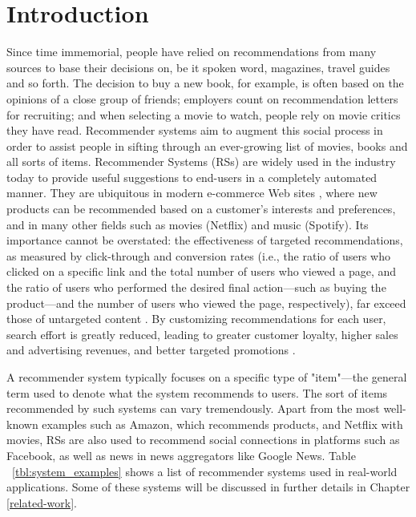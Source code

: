\documentclass[cic,tc,english]{iiufrgs}
\begin{document}



\chapter{Introduction} \label{introduction}
Since time immemorial, people have relied on recommendations from many sources to base their decisions on, be it spoken word, magazines, travel guides and so forth. The decision to buy a new book, for example, is often based on the opinions of a close group of friends; employers count on recommendation letters for recruiting; and when selecting a movie to watch, people rely on movie critics they have read. Recommender systems aim to augment this social process in order to assist people in sifting through an ever-growing list of movies, books and all sorts of items. Recommender Systems (RSs) are widely used in the industry today to provide useful suggestions to end-users in a completely automated manner. They are ubiquitous in modern e-commerce Web sites \cite{Schafer2001}, where new products can be recommended based on a customer's interests and preferences, and in many other fields such as movies (Netflix) and music (Spotify). Its importance cannot be overstated: the effectiveness of targeted recommendations, as measured by click-through and conversion rates (i.e., the ratio of users who clicked on a specific link and the total number of users who viewed a page, and the ratio of users who performed the desired final action---such as buying the product---and the number of users who viewed the page, respectively), far exceed those of untargeted content \cite{Linden2003}. By customizing recommendations for each user, search effort is greatly reduced, leading to greater customer loyalty, higher sales and advertising revenues, and better targeted promotions \cite{Ansari2000}.

A recommender system typically focuses on a specific type of "item"---the general term used to denote what the system recommends to users. The sort of items recommended by such systems can vary tremendously. Apart from the most well-known examples such as Amazon, which recommends products, and Netflix with movies, RSs are also used to recommend social connections in platforms such as Facebook, as well as news in news aggregators like Google News. Table ~\ref{tbl:system_examples} shows a list of recommender systems used in real-world applications. Some of these systems will be discussed in further details in Chapter \ref{related-work}.
\end{document}
